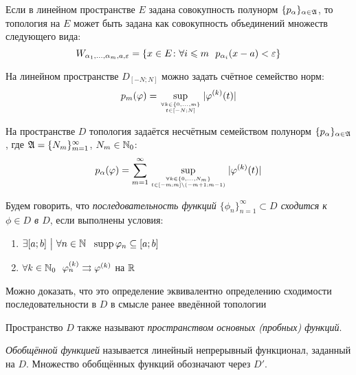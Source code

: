 \begin{proposition}
	Если в линейном пространстве $E$ задана совокупность полунорм $\{p_\alpha\}_{\alpha \in \mathfrak{A}}$, то топология на $E$ может быть задана как совокупность объединений множеств следующего вида:
	\[
		W_{\alpha_1, \ldots, \alpha_m, a, \varepsilon} = \{x \in E \colon \forall i \leqslant m\ \ p_{\alpha_i}(x - a) < \varepsilon\}
	\]
\end{proposition}

\begin{proposition}
	На линейном пространстве $D_{[-N; N]}$ можно задать счётное семейство норм:
	\[
		p_m(\varphi) = \sup_{\forall k \in \{0, \ldots, m\} \atop {t \in [-N; N]}} |\varphi^{(k)}(t)|
	\]
\end{proposition}

\begin{proposition}
	На пространстве $D$ топология задаётся несчётным семейством полунорм $\{p_\alpha\}_{\alpha \in \mathfrak{A}}$, где $\mathfrak{A} = \{N_m\}_{m = 1}^\infty$, $N_m \in \mathbb{N}_0$:
	\[
		p_{\alpha}(\varphi) = \sum_{m = 1}^\infty \sup_{\forall k \in \{0, \ldots, N_m\} \atop {t \in [-m; m] \backslash(-m + 1; m - 1)}} |\varphi^{(k)}(t)|
	\]
\end{proposition}

\begin{definition}
	Будем говорить, что \textit{последовательность функций $\{\phi_n\}_{n = 1}^\infty \subset D$ сходится к $\phi \in D$ в $D$}, если выполнены условия:
	\begin{enumerate}
		\item $\exists [a; b] \such \forall n \in \N\ \ \supp \phi_n \subseteq [a; b]$
		
		\item $\forall k \in \mathbb{N}_0\ \ \varphi_n^{(k)} \rightrightarrows \varphi^{(k)}$ на $\mathbb{R}$
	\end{enumerate}
\end{definition}

\begin{note}
	Можно доказать, что это определение эквивалентно определению сходимости последовательности в $D$ в смысле ранее введённой топологии
\end{note}

\begin{definition}
	Пространство $D$ также называют \textit{пространством основных (пробных) функций}.
\end{definition}

\begin{definition}
	\textit{Обобщённой функцией} называется линейный непрерывный функционал, заданный на $D$. Множество обобщённых функций обозначают через $D'$.
\end{definition}

